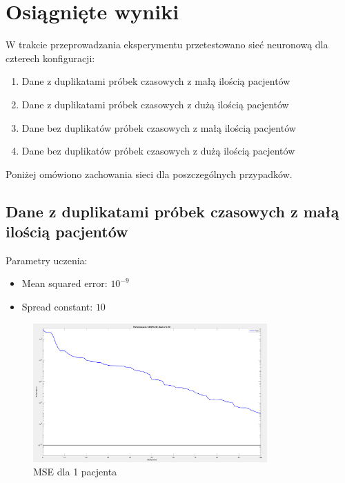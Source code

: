 \documentclass[12pt]{article}
\begin{document}
\newpage

\section{Osiągnięte wyniki}
W trakcie przeprowadzania eksperymentu przetestowano sieć neuronową dla czterech konfiguracji:

\begin{enumerate}
\item Dane z duplikatami próbek czasowych z małą ilością pacjentów
\item Dane z duplikatami próbek czasowych z dużą ilością pacjentów
\item Dane bez duplikatów próbek czasowych z małą ilością pacjentów
\item Dane bez duplikatów próbek czasowych z dużą ilością pacjentów
\end{enumerate}

Poniżej omówiono zachowania sieci dla poszczególnych przypadków.

\subsection{Dane z duplikatami próbek czasowych z małą ilością pacjentów}

Parametry uczenia:
\begin{itemize}
\item Mean squared error: $10^{-9}$
\item Spread constant: $10$
\end{itemize}

\begin{figure}[h!]

\centering
\includegraphics[width=0.8\textwidth]{mse-normal-1.png}
\caption{MSE dla 1 pacjenta}

\end{figure}
\end{document}
